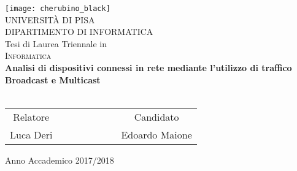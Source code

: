 



\begin{titlepage}
 \begin{center}
     \texttt{[image: cherubino\_black]}\\
     \vspace{1em}
     {\Large \textsc{UNIVERSIT\`A DI PISA}}\\
     \vspace{1em}
     {\Large \textsc{DIPARTIMENTO DI INFORMATICA}}\\
     \vspace{2em}
     {\normalsize Tesi di Laurea Triennale in}\\
     \vspace{1em}
     {\Large \textsc{Informatica}}\\
     \vspace{5em}
     {\LARGE \textbf{Analisi di dispositivi connessi in rete mediante l'utilizzo di traffico \\Broadcast e Multicast}}\\
     \vspace{1em}
     {\LARGE \textbf{}}\\
 \end{center}

\vskip 2.5cm
  \begin{center}
    \begin{tabular}{c c c c c c c c}
      Relatore & & & & & & & Candidato \\[0.2cm]
      \large{Luca Deri} & & & & & & & \large{Edoardo Maione}\\[0.4cm]
    \end{tabular}
  \end{center}

\vskip 2cm
\begin{center}
{\normalsize Anno Accademico 2017/2018}
\end{center}
\end{titlepage}

